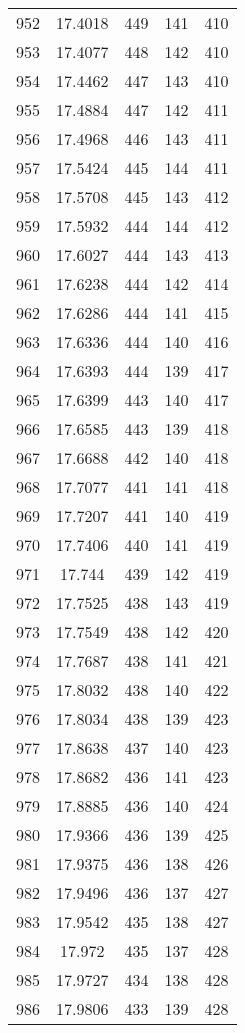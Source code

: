 \documentclass[12pt,a4paper]{article}
\begin{document}
\begin{tabular}{r|cccc}
	952 & 17.4018 & 449 & 141 & 410 \\
	953 & 17.4077 & 448 & 142 & 410 \\
	954 & 17.4462 & 447 & 143 & 410 \\
	955 & 17.4884 & 447 & 142 & 411 \\
	956 & 17.4968 & 446 & 143 & 411 \\
	957 & 17.5424 & 445 & 144 & 411 \\
	958 & 17.5708 & 445 & 143 & 412 \\
	959 & 17.5932 & 444 & 144 & 412 \\
	960 & 17.6027 & 444 & 143 & 413 \\
	961 & 17.6238 & 444 & 142 & 414 \\
	962 & 17.6286 & 444 & 141 & 415 \\
	963 & 17.6336 & 444 & 140 & 416 \\
	964 & 17.6393 & 444 & 139 & 417 \\
	965 & 17.6399 & 443 & 140 & 417 \\
	966 & 17.6585 & 443 & 139 & 418 \\
	967 & 17.6688 & 442 & 140 & 418 \\
	968 & 17.7077 & 441 & 141 & 418 \\
	969 & 17.7207 & 441 & 140 & 419 \\
	970 & 17.7406 & 440 & 141 & 419 \\
	971 & 17.744 & 439 & 142 & 419 \\
	972 & 17.7525 & 438 & 143 & 419 \\
	973 & 17.7549 & 438 & 142 & 420 \\
	974 & 17.7687 & 438 & 141 & 421 \\
	975 & 17.8032 & 438 & 140 & 422 \\
	976 & 17.8034 & 438 & 139 & 423 \\
	977 & 17.8638 & 437 & 140 & 423 \\
	978 & 17.8682 & 436 & 141 & 423 \\
	979 & 17.8885 & 436 & 140 & 424 \\
	980 & 17.9366 & 436 & 139 & 425 \\
	981 & 17.9375 & 436 & 138 & 426 \\
	982 & 17.9496 & 436 & 137 & 427 \\
	983 & 17.9542 & 435 & 138 & 427 \\
	984 & 17.972 & 435 & 137 & 428 \\
	985 & 17.9727 & 434 & 138 & 428 \\
	986 & 17.9806 & 433 & 139 & 428 \\

\end{tabular}
\end{document}
